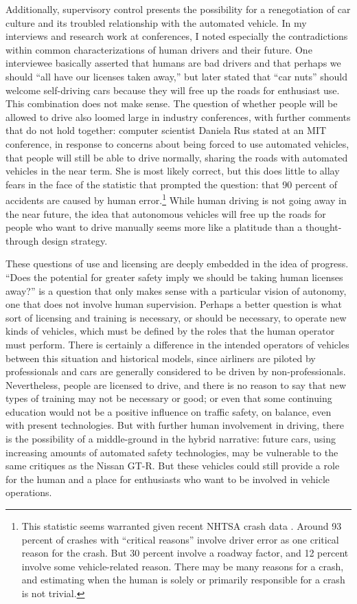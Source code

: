 Additionally, supervisory control presents the possibility for a
renegotiation of car 
culture and its troubled relationship with the automated vehicle. In
my interviews and research work at conferences, I noted especially the
contradictions within common characterizations of human
drivers and their future. One interviewee basically asserted that
humans are bad drivers and that perhaps we should ``all have our
licenses taken away,'' but later stated that ``car nuts'' should
welcome self-driving cars because they will free up the roads for
enthusiast use. This combination does not make sense. The
question of whether people will be allowed to drive also loomed large
in industry conferences, with further comments that do not hold
together: computer scientist Daniela Rus stated at an MIT
conference, in response to
concerns about being 
forced to use automated vehicles, that people will still be able to
drive normally, sharing the roads with automated vehicles in the near
term. She is most likely correct, but this 
does little to allay fears in the face of the statistic that prompted
the question: that 90 percent of accidents are caused by human
error.\footnote{This statistic seems warranted given recent NHTSA crash
  data \cite{NHTSAcrash}. Around 93 percent of crashes with ``critical
  reasons'' involve driver error as one critical reason for the crash.
  But 30 percent involve a roadway factor, and 12 percent involve some
vehicle-related reason. There may be many reasons for a crash, and
estimating when the human is solely or primarily responsible for a
crash is not trivial.} While
human driving is not going away in the near future, the idea that
autonomous vehicles will free up the roads for people who want to
drive manually seems more like a platitude than a thought-through
design strategy. 


These questions of use and licensing are deeply embedded in the idea
of progress. ``Does the potential for greater safety imply we should be
taking human licenses away?'' is a question that only makes
sense with a particular vision of autonomy, one that does not involve
human supervision. Perhaps a better question is what sort of licensing
and training is necessary, or should be necessary, to operate new
kinds of vehicles, which must be defined by the roles that the human
operator must perform. There is certainly a difference in the intended
operators of vehicles between this situation and historical models,
since airliners are piloted by professionals
and cars are generally considered to be driven by non-professionals.
Nevertheless, people are licensed to drive, and there is no reason to
say that new types of training may not be necessary or good;
or even that some continuing education would not be a positive
influence on traffic safety, on balance, even with present
technologies. But with further human involvement in driving, there is
the possibility of a
middle-ground in the hybrid narrative:  future cars, using increasing
amounts of automated safety technologies,
may be vulnerable to the same critiques as the Nissan GT-R. But these
vehicles could still provide a role for the human and a place for
enthusiasts who want to be involved in vehicle operations.

